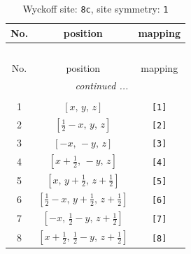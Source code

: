 \documentclass[fleqn,8pt]{jsarticle}
\begin{document}
\renewcommand{\arraystretch}{1.2}
\begin{longtable}{ccc}
\caption{Wyckoff site: {\tt 8c}, site symmetry: {\tt 1}}
 \\
 \hline \hline
No. & position & mapping \\ \hline \endfirsthead

\multicolumn{2}{l}{\tablename\ \thetable{}} \\
 \hline \hline
No. & position & mapping \\ \hline \endhead

 \hline \hline
\multicolumn{2}{r}{\footnotesize\it continued ...} \\ \endfoot

 \hline \hline
\multicolumn{2}{r}{} \\ \endlastfoot

1 & $\left[ x,\, y,\, z \right]$ & {\tt [1]} \\ \hline
2 & $\left[ \frac{1}{2} - x,\, y,\, z \right]$ & {\tt [2]} \\ \hline
3 & $\left[ - x,\, - y,\, z \right]$ & {\tt [3]} \\ \hline
4 & $\left[ x + \frac{1}{2},\, - y,\, z \right]$ & {\tt [4]} \\ \hline
5 & $\left[ x,\, y + \frac{1}{2},\, z + \frac{1}{2} \right]$ & {\tt [5]} \\ \hline
6 & $\left[ \frac{1}{2} - x,\, y + \frac{1}{2},\, z + \frac{1}{2} \right]$ & {\tt [6]} \\ \hline
7 & $\left[ - x,\, \frac{1}{2} - y,\, z + \frac{1}{2} \right]$ & {\tt [7]} \\ \hline
8 & $\left[ x + \frac{1}{2},\, \frac{1}{2} - y,\, z + \frac{1}{2} \right]$ & {\tt [8]} \\
\end{longtable}
\end{document}
